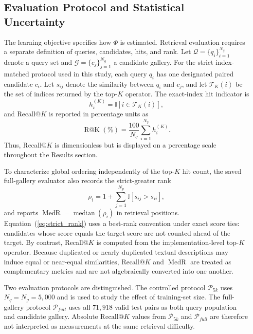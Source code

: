 \documentclass[runningheads]{llncs}
\begin{document}
\subsection{Evaluation Protocol and Statistical Uncertainty}
\label{sec:evaluation_formalism}

The learning objective specifies how $\Phi$ is estimated. Retrieval evaluation requires a separate definition of queries, candidates, hits, and rank. Let $\mathcal{Q}=\{q_i\}_{i=1}^{N_q}$ denote a query set and $\mathcal{G}=\{c_j\}_{j=1}^{N_g}$ a candidate gallery. For the strict index-matched protocol used in this study, each query $q_i$ has one designated paired candidate $c_i$. Let $s_{ij}$ denote the similarity between $q_i$ and $c_j$, and let $\mathcal{T}_{K}(i)$ be the set of indices returned by the top-$K$ operator. The exact-index hit indicator is
\begin{equation}
 h_i^{(K)}=\mathbb{I}\left[i\in\mathcal{T}_{K}(i)\right],
\end{equation}
and Recall@$K$ is reported in percentage units as
\begin{equation}
 \operatorname{R@K}(\%)=\frac{100}{N_q}\sum_{i=1}^{N_q} h_i^{(K)}.
 \label{eq:recall_percent}
\end{equation}
Thus, Recall@$K$ is dimensionless but is displayed on a percentage scale throughout the Results section.

To characterize global ordering independently of the top-$K$ hit count, the saved full-gallery evaluator also records the strict-greater rank
\begin{equation}
 \rho_i=1+\sum_{j=1}^{N_g}\mathbb{I}\left[s_{ij}>s_{ii}\right],
 \label{eq:strict_rank}
\end{equation}
and reports $\operatorname{MedR}=\operatorname{median}(\rho_i)$ in retrieval positions. Equation~(\ref{eq:strict_rank}) uses a best-rank convention under exact score ties: candidates whose score equals the target score are not counted ahead of the target. By contrast, Recall@$K$ is computed from the implementation-level top-$K$ operator. Because duplicated or nearly duplicated textual descriptions may induce equal or near-equal similarities, Recall@$K$ and $\operatorname{MedR}$ are treated as complementary metrics and are not algebraically converted into one another.

Two evaluation protocols are distinguished. The controlled protocol $\mathcal{P}_{5k}$ uses $N_q=N_g=5{,}000$ and is used to study the effect of training-set size. The full-gallery protocol $\mathcal{P}_{full}$ uses all $71{,}918$ valid test pairs as both query population and candidate gallery. Absolute Recall@$K$ values from $\mathcal{P}_{5k}$ and $\mathcal{P}_{full}$ are therefore not interpreted as measurements at the same retrieval difficulty.
\end{document}
